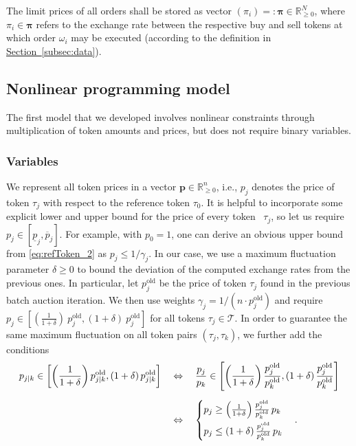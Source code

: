 \documentclass[11pt,parskip=full]{scrartcl}%
\newcommand*{\ie}{i.e., }
\newcommand*{\wrt}{with respect to }
\newcommand*{\tokens}{\mathcal{T}}          %
\newcommand*{\subsecref}[1]{\hyperref[{#1}]{Section~\ref*{#1}}}
\begin{document}
The limit prices of all orders shall be stored as vector $ (\pi_i) =: \bm{\pi} \in \mathbb{R}^N_
{\ge 0} $, where $ \pi_i \in \bm{\pi} $ refers to the exchange rate between the respective buy and
sell tokens at which order $ \omega_i $ may be executed (according to the definition in
\subsecref{subsec:data}).


\subsection{Nonlinear programming model}
\label{subsec:NLPmodel}

The first model that we developed involves nonlinear constraints through multiplication of token
amounts and prices, but does not require binary variables.

\subsubsection*{Variables}

We represent all token prices in a vector $ \mathbf{p} \in \mathbb{R}^n_{\ge 0} $, \ie $ p_j $
denotes the price of token $ \tau_j $ \wrt the reference token $ \tau_0 $.
It is helpful to incorporate some explicit lower and upper bound for the price of every token~
$ \tau_j $, so let us require $ p_j \in [\underline{p}_j,\overline{p}_j] $.
For example, with $ p_0 = 1 $, one can derive an obvious upper bound from \eqref{eq:refToken_2} as
$ p_j \le 1/\gamma_j $.
In our case, we use a maximum fluctuation parameter $ \delta \ge 0 $ to bound the deviation of the
computed exchange rates from the previous ones.
In particular, let $ p^\mathrm{old}_j $ be the price of token $ \tau_j $ found in the previous
batch auction iteration.
We then use weights $ \gamma_j = 1 / (n \cdot p^\mathrm{old}_j) $ and require
$ p_j \in [(\frac{1} {1+\delta}) \> p^\mathrm{old}_j, (1+\delta) \> p^\mathrm{old}_j] $
for all tokens $ \tau_j \in \tokens $.
In order to guarantee the same maximum fluctuation on all token pairs $ (\tau_j,\tau_k) $,
we further add the conditions
\begin{align}
  p_{j|k} \in
  \left[
    \left(\frac{1}{1+\delta}\right) p^\mathrm{old}_{j|k},
    (1+\delta) \, p^\mathrm{old}_{j|k}
  \right]
  \quad &\Leftrightarrow \quad
  \frac{p_j}{p_k} \in
  \left[
    \left(\frac{1}{1+\delta}\right) \frac{p^\mathrm{old}_j}{p^\mathrm{old}_k},
    (1+\delta) \, \frac{p^\mathrm{old}_j}{p^\mathrm{old}_k}
  \right]\notag\\[2mm]
  \quad &\Leftrightarrow \quad
  \begin{cases}
    p_j \ge \left(\frac{1}{1+\delta}\right) \frac{p^\mathrm{old}_j}{p^\mathrm{old}_k} \, p_k
    \\[2mm]
    p_j \le \left(1+\delta\right) \frac{p^\mathrm{old}_j}{p^\mathrm{old}_k} \, p_k
  \end{cases}.
\end{align}
\end{document}
